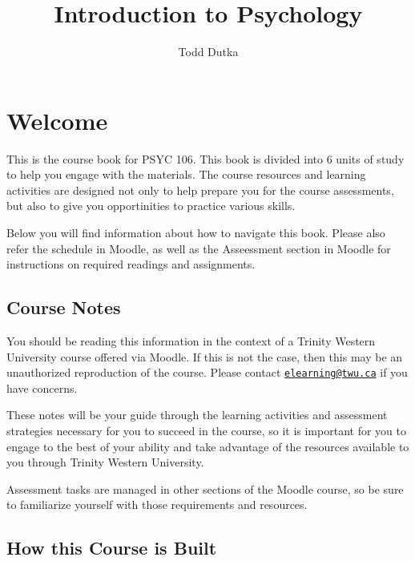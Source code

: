 \documentclass[
]{book}
\title{Introduction to Psychology}
\author{Todd Dutka}
\date{}
\begin{document}
\maketitle

{
\setcounter{tocdepth}{1}
\tableofcontents
}
\hypertarget{welcome}{%
\chapter*{Welcome}\label{welcome}}

This is the course book for PSYC 106. This book is divided into 6 units of study to help you engage with the materials. The course resources and learning activities are designed not only to help prepare you for the course assessments, but also to give you opportinities to practice various skills.

Below you will find information about how to navigate this book. Please also refer the schedule in Moodle, as well as the Asseessment section in Moodle for instructions on required readings and assignments.

\hypertarget{course-notes}{%
\section*{Course Notes}\label{course-notes}}

You should be reading this information in the context of a Trinity Western University course offered via Moodle. If this is not the case, then this may be an unauthorized reproduction of the course. Please contact \href{mailto:elearning@twu.ca}{\nolinkurl{elearning@twu.ca}} if you have concerns.

These notes will be your guide through the learning activities and assessment strategies necessary for you to succeed in the course, so it is important for you to engage to the best of your ability and take advantage of the resources available to you through Trinity Western University.

Assessment tasks are managed in other sections of the Moodle course, so be sure to familiarize yourself with those requirements and resources.

\hypertarget{how-this-course-is-built}{%
\section*{How this Course is Built}\label{how-this-course-is-built}}
\end{document}
